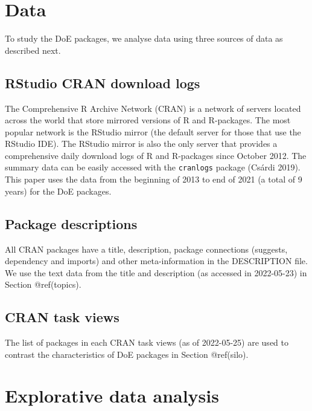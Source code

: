 \documentclass{article}
\begin{document}
\hypertarget{data}{%
\section{Data}\label{data}}

To study the DoE packages, we analyse data using three sources of data
as described next.

\hypertarget{rstudio-cran-download-logs}{%
\subsection{RStudio CRAN download
logs}\label{rstudio-cran-download-logs}}

The Comprehensive R Archive Network (CRAN) is a network of servers
located across the world that store mirrored versions of R and
R-packages. The most popular network is the RStudio mirror (the default
server for those that use the RStudio IDE). The RStudio mirror is also
the only server that provides a comprehensive daily download logs of R
and R-packages since October 2012. The summary data can be easily
accessed with the \texttt{cranlogs} package (Csárdi 2019). This paper
uses the data from the beginning of 2013 to end of 2021 (a total of 9
years) for the DoE packages.

\hypertarget{package-descriptions}{%
\subsection{Package descriptions}\label{package-descriptions}}

All CRAN packages have a title, description, package connections
(suggests, dependency and imports) and other meta-information in the
DESCRIPTION file. We use the text data from the title and description
(as accessed in 2022-05-23) in Section @ref(topics).

\hypertarget{cran-task-views}{%
\subsection{CRAN task views}\label{cran-task-views}}

The list of packages in each CRAN task views (as of 2022-05-25) are used
to contrast the characteristics of DoE packages in Section @ref(silo).

\hypertarget{eda}{%
\section{Explorative data analysis}\label{eda}}
\end{document}

